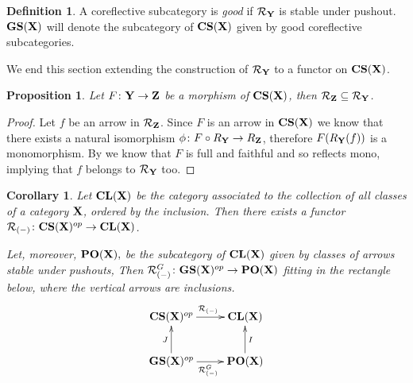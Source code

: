 \documentclass[a4paper]{article}
\newcommand{\cori}{\mathbf{CS}}
\newcommand{\cla}{\mathbf{CL}}
\newcommand{\pos}{\mathbf{PO}}
\newcommand{\gori}{\mathbf{GS}}
\def\X{\textbf {\textup{X}}}
\def\Y{\textbf {\textup{Y}}}
\def\Z{\textbf {\textup{Z}}}
\newtheorem{proposition}[theorem]{Proposition}
\newtheorem{corollary}[theorem]{Corollary}
\theoremstyle{definition}
\newtheorem{definition}[theorem]{Definition}
\newtheorem{remark}[theorem]{Remark}
\begin{document}
 \begin{definition}
A coreflective subcategory is \emph{good} if  $\mathcal{R}_\Y$ is stable under pushout. $\gori(\X)$ will denote the subcategory of $\cori(\X)$ given by good coreflective subcategories. 
 \end{definition}
 
\iffalse 
 \begin{remark}\label{rem:good}
Let $\Y$ be a full subcategory of $\X$ with coreflector $R_\Y$.  Let also $f\colon X\to Y$ be in $\mathcal{R}_\Y$ and consider the following two diagrams, where the left one is a pushout. Then $\Y$ is a good subcategory if and only if $R_{\Y}()$
 \end{remark}
 \fi 
 
 We end this section extending the construction of $\mathcal{R}_\Y$ to a functor on $\cori(\X)$.

 \begin{proposition}\label{prop:funct}
 Let $F\colon \Y \to \Z$ be a morphism of $\cori(\X)$, then $\mathcal{R}_\Z \subseteq \mathcal{R}_{\Y}$.
 \end{proposition}
 \begin{proof}
 Let $f$ be an arrow in $\mathcal{R}_\Z$. Since $F$ is an arrow in $\cori(\X)$ we know that there exists a natural isomorphism $\phi\colon F\circ R_\Y\to R_\Z$, therefore $F(R_\Y(f))$ is a monomorphism. By  we know that $F$ is full and faithful and so reflects mono, implying that $f$ belongs to $\mathcal{R}_\Y$ too.
 \end{proof}
 
 \begin{corollary}\label{cor:funct}
 Let $\cla(\X)$ be the category associated to the collection of all classes of a category $\X$, ordered by the inclusion. Then there exists a functor $\mathcal{R}_{(-)}\colon \cori(\X)^{op}\to \cla(\X) $.
 
 Let, moreover, $\pos(\X),$ be the subcategory of $\cla(\X)$  given by classes of arrows stable under pushouts, Then  $\mathcal{R}^G_{(-)}\colon \gori(\X)^{op}\to \pos(\X) $ fitting in the rectangle below, where the vertical arrows are inclusions.
 \[\xymatrix{\cori(\X)^{op} \ar[r]^{\mathcal{R}_{(-)}}& \cla(\X)\\ \gori(\X)^{op} \ar[u]^{J} \ar[r]_{\mathcal{R}^{G}_{(-)}}& \pos(\X) \ar[u]_{I}}\]
 \end{corollary}
 
\end{document}
